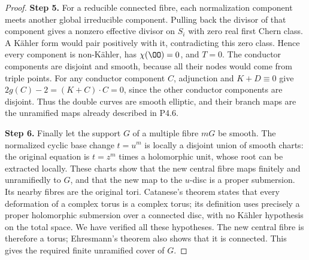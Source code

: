 \begin{proof}
\noindent\textbf{Step 5.} For a reducible connected fibre, each normalization component meets
another global irreducible component. Pulling back the divisor of
that component gives a nonzero effective divisor on $S_i$ with zero
real first Chern class. A Kähler form would pair positively with it,
contradicting this zero class. Hence every component is non-Kähler,
has $\chi(\OO)=0$, and $T=0$. The conductor components are disjoint
and smooth, because all their nodes would come from triple points.
For any conductor component $C$, adjunction and $K+D\equiv0$ give
$2g(C)-2=(K+C)\cdot C=0$, since the other conductor components
are disjoint. Thus the double curves are smooth elliptic, and their
branch maps are the unramified maps already described in P4.6.

\noindent\textbf{Step 6.} Finally let the support $G$ of a multiple fibre $mG$ be smooth. The
normalized cyclic base change $t=u^m$ is locally a disjoint union of
smooth charts: the original equation is $t=z^m$ times a holomorphic
unit, whose root can be extracted locally. These charts show that
the new central fibre maps finitely and unramifiedly to $G$, and
that the new map to the $u$-disc is a proper submersion. Its nearby
fibres are the original tori. Catanese's theorem
\cite[Theorem~2.1]{Catanese2004} states that every
deformation of a complex torus is a complex torus; its definition
uses precisely a proper holomorphic submersion over a connected
disc, with no Kähler hypothesis on the total space. We have verified
all these hypotheses. The new central fibre is therefore a torus;
Ehresmann's theorem also shows that it is connected. This gives
the required finite unramified cover of $G$.
\end{proof}

